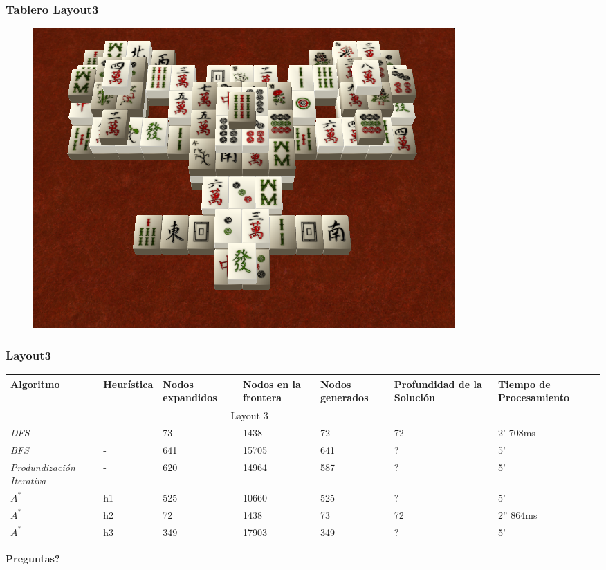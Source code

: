 \documentclass{beamer}
\begin{document}
\begin{frame}
\frametitle{Tablero Layout3}
\begin{figure}[hb]
	\includegraphics[scale=0.3]{../Boards/Layout4.png}
	 \label{fig:layout4}
\end{figure}
\end{frame}

\begin{frame}
\frametitle{Layout3}

\tiny{
\begin{table}[h]
\begin{center}
	\begin{tabular}{|p{1.3cm}|p{1.0cm}|p{1cm}|p{1cm}|p{1cm}|p{1cm}|p{2cm}|}
	\hline
	 Algoritmo & Heur\'istica & Nodos expandidos & Nodos en la frontera & Nodos generados & Profundidad de la Soluci\'on & Tiempo de Procesamiento\\
	\hline \hline
		 \multicolumn{6}{|c|}{Layout 3} \\
	\hline
	\textit{DFS} & - & 73 & 1438 & 72 & 72 & 2' 708ms \\
	\textit{BFS} & - & 641 & 15705 & 641 & ? & 5' \\
	\textit{Produndizaci\'on Iterativa} & - & 620 & 14964 & 587 & ? & 5' \\	
	\textit{$A^*$} & h1 & 525 &  10660 & 525 & ? & 5' \\
	\textit{$A^*$} & h2 & 72 & 1438 & 73 & 72 & 2'' 864ms\\
	\textit{$A^*$} & h3 & 349 & 17903 & 349 & ? & 5' \\	
	\hline
	\end{tabular}
\end{center}
\label{tab:costLayout4}
\end{table}}

\end{frame}

\begin{frame}
\textbf{\Huge{Preguntas?}}
\end{frame}
\end{document}
